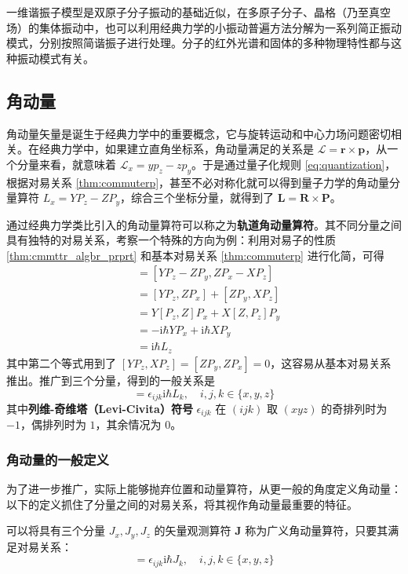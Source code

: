 \documentclass[cn,10pt,math=newtx,citestyle=gb7714-2015,bibstyle=gb7714-2015]{elegantbook}
\def\bm{\boldsymbol}
\def\mc{\mathcal}
\def\i{\mathrm i}
\begin{document}
一维谐振子模型是双原子分子振动的基础近似，在多原子分子、晶格（乃至真空场）的集体振动中，也可以利用经典力学的小振动普遍方法分解为一系列简正振动模式，分别按照简谐振子进行处理。分子的红外光谱和固体的多种物理特性都与这种振动模式有关。

\subsection{角动量}

角动量矢量是诞生于经典力学中的重要概念，它与旋转运动和中心力场问题密切相关。在经典力学中，如果建立直角坐标系，角动量满足的关系是 $\bm{\mc L}=\bm r\times \bm p$，从一个分量来看，就意味着 $\mc L_x=yp_z-zp_y$。于是通过量子化规则 \ref{eq:quantization}，根据对易关系 \ref{thm:commuterp}，甚至不必对称化就可以得到量子力学的角动量分量算符 $L_x=YP_z-ZP_y$，综合三个坐标分量，就得到了 $\bm L=\bm R\times \bm P$。

通过经典力学类比引入的角动量算符可以称之为\textbf{轨道角动量算符}。其不同分量之间具有独特的对易关系，考察一个特殊的方向为例：利用对易子的性质 \ref{thm:cmmttr_algbr_prprt} 和基本对易关系 \ref{thm:commuterp} 进行化简，可得
\begin{align}
    [L_x,L_y] & = [YP_z-ZP_y, ZP_x-XP_z]\nonumber\\
    & = [YP_z,ZP_x] + [ZP_y,XP_z]\nonumber\\
    & = Y[P_z,Z]P_x+X[Z,P_z]P_y\nonumber\\
    & = -\i\hbar YP_x+\i\hbar XP_y\nonumber\\
    & = \i\hbar L_z
\end{align}
其中第二个等式用到了 $[YP_z,XP_z]=[ZP_y,ZP_x]=0$，这容易从基本对易关系 推出。推广到三个分量，得到的一般关系是
\begin{equation}
    [L_i,L_j]=\epsilon_{ijk}\i\hbar L_k,\quad i,j,k\in\{x,y,z\}
\end{equation}
其中\textbf{列维-奇维塔（Levi-Civita）符号} $\epsilon_{ijk}$ 在 $(ijk)$ 取 $(xyz)$ 的奇排列时为 $-1$，偶排列时为 $1$，其余情况为 $0$。

\subsubsection{角动量的一般定义}

为了进一步推广，实际上能够抛弃位置和动量算符，从更一般的角度定义角动量：以下的定义抓住了分量之间的对易关系，将其视作角动量最重要的特征。

\begin{definition}[广义角动量算符]\label{def:gnrl_anglr_mmntm}
   可以将具有三个分量 $J_x,J_y,J_z$ 的矢量观测算符 $\bm J$ 称为广义角动量算符，只要其满足对易关系：
\begin{equation}
    [J_i,J_j]=\epsilon_{ijk}\i\hbar J_k,\quad i,j,k\in\{x,y,z\}
\end{equation}
\end{definition}
\end{document}
